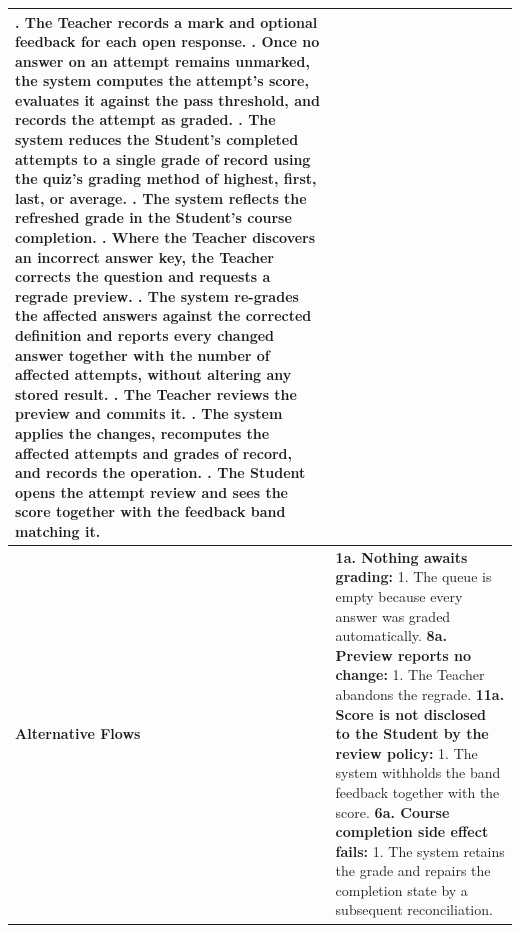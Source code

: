 \begin{longtable}{|>{\raggedright\arraybackslash}p{}|>{\raggedright\arraybackslash}p{}|}
3. The Teacher records a mark and optional feedback for each open response. \newline
4. Once no answer on an attempt remains unmarked, the system computes the attempt's score, evaluates it against the pass threshold, and records the attempt as graded. \newline
5. The system reduces the Student's completed attempts to a single grade of record using the quiz's grading method of highest, first, last, or average. \newline
6. The system reflects the refreshed grade in the Student's course completion. \newline
7. Where the Teacher discovers an incorrect answer key, the Teacher corrects the question and requests a regrade preview. \newline
8. The system re-grades the affected answers against the corrected definition and reports every changed answer together with the number of affected attempts, without altering any stored result. \newline
9. The Teacher reviews the preview and commits it. \newline
10. The system applies the changes, recomputes the affected attempts and grades of record, and records the operation. \newline
11. The Student opens the attempt review and sees the score together with the feedback band matching it. \\ \hline
\textbf{Alternative Flows} &
\textbf{1a. Nothing awaits grading:} \newline
\hspace*{1em}1. The queue is empty because every answer was graded automatically. \newline
\textbf{8a. Preview reports no change:} \newline
\hspace*{1em}1. The Teacher abandons the regrade. \newline
\textbf{11a. Score is not disclosed to the Student by the review policy:} \newline
\hspace*{1em}1. The system withholds the band feedback together with the score. \newline
\textbf{6a. Course completion side effect fails:} \newline
\hspace*{1em}1. The system retains the grade and repairs the completion state by a subsequent reconciliation. \\
\end{longtable}

